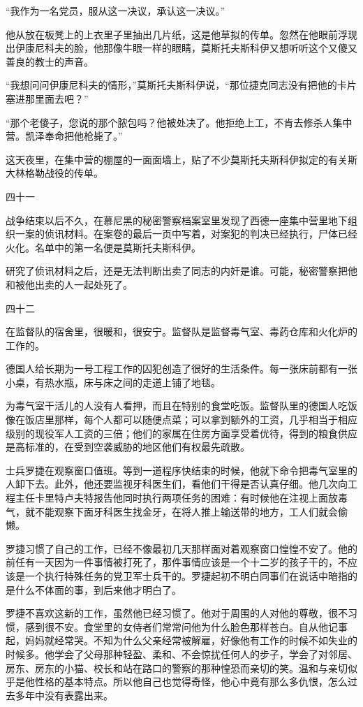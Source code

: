 “我作为一名党员，服从这一决议，承认这一决议。”

他从放在板凳上的上衣里子里抽出几片纸，这是他草拟的传单。忽然在他眼前浮现出伊康尼科夫的脸，他那像牛眼一样的眼睛，莫斯托夫斯科伊又想听听这个又傻又善良的教士的声音。

“我想问问伊康尼科夫的情形，”莫斯托夫斯科伊说，“那位捷克同志没有把他的卡片塞进那里面去吧？”

“那个老傻子，您说的那个脓包吗？他被处决了。他拒绝上工，不肯去修杀人集中营。凯泽奉命把他枪毙了。”

这天夜里，在集中营的棚屋的一面面墙上，贴了不少莫斯托夫斯科伊拟定的有关斯大林格勒战役的传单。

四十一

战争结束以后不久，在慕尼黑的秘密警察档案室里发现了西德一座集中营里地下组织一案的侦讯材料。在案卷的最后一页中写着，对案犯的判决已经执行，尸体已经火化。名单中的第一名便是莫斯托夫斯科伊。

研究了侦讯材料之后，还是无法判断出卖了同志的内奸是谁。可能，秘密警察把他和被他出卖的人一起处死了。

四十二

在监督队的宿舍里，很暖和，很安宁。监督队是监督毒气室、毒药仓库和火化炉的工作的。

德国人给长期为一号工程工作的囚犯创造了很好的生活条件。每一张床前都有一张小桌，有热水瓶，床与床之间的走道上铺了地毯。

为毒气室干活儿的人没有人看押，而且在特别的食堂吃饭。监督队里的德国人吃饭像在饭店里那样，每个人都可以随便点菜；可以拿到额外的工资，几乎相当于相应级别的现役军人工资的三倍；他们的家属在住房方面享受着优待，得到的粮食供应是高标准的，在受到空袭威胁的地区他们有权最先疏散。

士兵罗捷在观察窗口值班。等到一道程序快结束的时候，他就下命令把毒气室里的人卸下去。此外，他还要监视牙科医生们，看他们干得是否认真仔细。他几次向工程主任卡里特卢夫特报告他同时执行两项任务的困难：有时候他在注视上面放毒气，就不能观察下面牙科医生找金牙，在将人推上输送带的地方，工人们就会偷懒。

罗捷习惯了自己的工作，已经不像最初几天那样面对着观察窗口惶惶不安了。他的前任有一天因为一件事情被打死了，那件事情应该是一个十二岁的孩子干的，不应该是一个执行特殊任务的党卫军士兵干的。罗捷起初不明白同事们在说话中暗指的是什么不体面的事，到后来他才明白了。

罗捷不喜欢这新的工作，虽然他已经习惯了。他对于周围的人对他的尊敬，很不习惯，感到很不安。食堂里的女侍者们常常问他为什么脸色那样苍白。自从他记事起，妈妈就经常哭。不知为什么父亲经常被解雇，好像他有工作的时候不如失业的时候多。他学会了父母那种轻盈、柔和、不会惊扰任何人的步子，学会了对邻居、房东、房东的小猫、校长和站在路口的警察的那种惶恐而亲切的笑。温和与亲切似乎是他性格的基本特点。所以他自己也觉得奇怪，他心中竟有那么多仇恨，怎么过去多年中没有表露出来。


